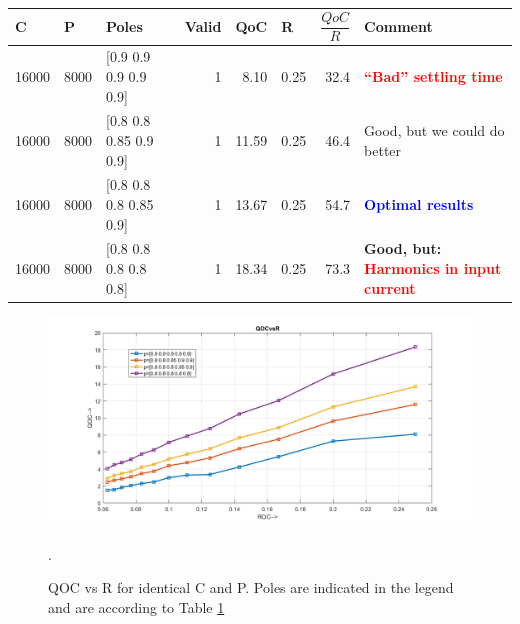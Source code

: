 \begin{enumerate}
		\begin{table}[htbp]
			\caption{}
			\begin{tabular}{rrlrrrrl}
				\toprule
				\multicolumn{1}{l}{C} & \multicolumn{1}{l}{P} & Poles & \multicolumn{1}{l}{Valid} & \multicolumn{1}{l}{QoC} & \multicolumn{1}{l}{R} & \multicolumn{1}{l}{$\dfrac{QoC}{R}$  } & Comment \\ 
				\midrule
				16000 & 8000 & [0.9 0.9 0.9 0.9 0.9] & 1 & 8.10 & 0.25 & 32.4 & \textcolor{red}{\textbf{“Bad” settling time}} \\ 
				16000 & 8000 & [0.8 0.8 0.85 0.9 0.9] & 1 & 11.59 & 0.25 & 46.4 & Good, but we could do better \\ 
				16000 & 8000 & [0.8 0.8 0.8 0.85 0.9] & 1 & 13.67 & 0.25 & 54.7 & \textcolor{blue}{\textbf{Optimal results}} \\ 
				16000 & 8000 & [0.8 0.8 0.8 0.8 0.8] & 1 & 18.34 & 0.25 & 73.3 & \textbf{Good, but: \textcolor{red}{Harmonics in input current}} \\ 
				\midrule
			\end{tabular}
			\label{tab:poles}
		\end{table}
\end{enumerate}

\begin{figure}[h]
	\begin{center}
		\includegraphics[width=\linewidth]{img/q2}
		\caption{QOC vs R for identical C and P. Poles are indicated in the legend and are according to Table \ref{tab:poles}}.
		\label{fig:qoc2}
	\end{center}
\end{figure}